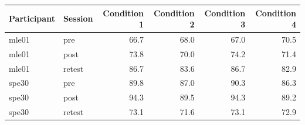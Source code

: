 \begin{tabular}{@{}llrrrr@{}}
\toprule
Participant & Session & Condition 1 & Condition 2 & Condition 3 & Condition 4 \\
\midrule
mle01 & pre & 66.7 & 68.0 & 67.0 & 70.5 \\
mle01 & post & 73.8 & 70.0 & 74.2 & 71.4 \\
mle01 & retest & 86.7 & 83.6 & 86.7 & 82.9 \\
spe30 & pre & 89.8 & 87.0 & 90.3 & 86.3 \\
spe30 & post & 94.3 & 89.5 & 94.3 & 89.2 \\
spe30 & retest & 73.1 & 71.6 & 73.1 & 72.9 \\
\bottomrule
\end{tabular}
